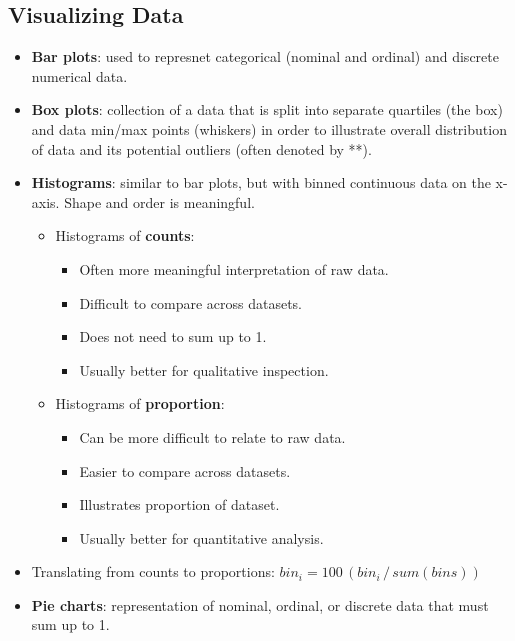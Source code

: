 \documentclass[12pt,a4paper]{article}
\begin{document}
\subsection{Visualizing Data}
\begin{itemize}
    \item \textbf{Bar plots}: used to represnet {\color{o-Sun}categorical} (nominal and ordinal) and {\color{o-Sun}discrete numerical} data.
    \item \textbf{Box plots}: collection of a data that is split into separate quartiles (the box) and data min/max points (whiskers) in order to illustrate {\color{o-Sun}overall distribution} of data and its potential outliers (often denoted by **). 
    \item \textbf{Histograms}: similar to bar plots, but with binned continuous data on the x-axis. {\color{o-Sun}Shape} and {\color{o-Sun}order} is meaningful.
        \begin{itemize}
            \item Histograms of \textbf{counts}: 
                \begin{itemize}
                    \item Often more meaningful interpretation of raw data.
                    \item Difficult to compare across datasets.
                    \item Does not need to sum up to 1.
                    \item Usually better for {\color{o-Sun}qualitative} inspection.
                \end{itemize}
            \item Histograms of \textbf{proportion}:
                \begin{itemize}
                    \item Can be more difficult to relate to raw data.
                    \item Easier to compare across datasets.
                    \item Illustrates proportion of dataset.
                    \item Usually better for {\color{o-Sun}quantitative} analysis.
                \end{itemize}
        \end{itemize}
    \item Translating from counts to proportions: \(bin_i = 100\,(bin_i \,/\, sum(bins))\)
    \item \textbf{Pie charts}: representation of nominal, ordinal, or discrete data that must sum up to 1.
\end{itemize}
\end{document}

